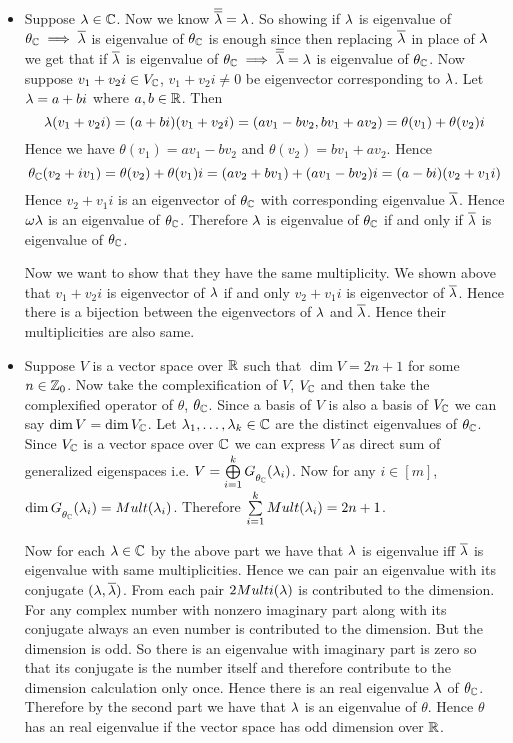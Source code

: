 \documentclass[a4paper, 11pt]{article}
\begin{document}
{\begin{itemize}[label=$\bullet$]
\begin{itemize}
			\item Suppose $\lambda \in \mathbb{C}$. Now we know $\overline{\overline{\lambda}}=\lambda$. So showing if $\lambda$ is eigenvalue of $\theta_{\mathbb{C}}\implies \overline{\lambda}$ is eigenvalue of $\theta_{\mathbb{C}}$ is enough since then replacing $\overline{\lambda}$ in place of $\lambda$ we get that if $\overline{\lambda}$ is eigenvalue of $\theta_{\mathbb{C}}\implies \overline{\overline{\lambda}}=\lambda$ is eigenvalue of $\theta_{\mathbb{C}}$. Now suppose $v_1+v_2i\in V_{\mathbb{C}}$, $v_1+v_2i\neq  0$ be eigenvector corresponding to $\lambda$. Let $\lambda=a+bi$ where $a,b\in \mathbb{R}$. Then $$\lambda(v_1+v_2i)=(a+bi)(v_1+v_2i)=(av_1-bv_2,bv_1+av_2)=\theta(v_1)+\theta(v_2)i$$Hence we have $\theta(v_1)=av_1-bv_2$ and $\theta(v_2)=bv_1+av_2$. Hence $$\theta_{\mathbb{C}}(v_2+iv_1)=\theta(v_2)+\theta(v_1)i=(av_2+bv_1)+(av_1-bv_2)i=(a-bi)(v_2+v_1i)$$Hence $v_2+v_1i$ is an eigenvector of $\theta_{\mathbb{C}}$ with corresponding eigenvalue $\overline{\lambda}$. Hence $\omega{\lambda}$ is an eigenvalue of $\theta_{\mathbb{C}}$. Therefore $\lambda$ is eigenvalue of $\theta_{\mathbb{C}}$ if and only if $\overline{\lambda}$ is eigenvalue of $\theta_{\mathbb{C}}$. \parinn
			
			Now we want to show that they have the same multiplicity. We shown above that $v_1+v_2i$ is eigenvector of $\lambda$ if and only $v_2+v_1i$ is eigenvector of $\overline{\lambda}$. Hence there is a bijection between the eigenvectors of $\lambda$ and $\overline{\lambda}$. Hence their multiplicities are also same.
			
			\item Suppose $V$ is a vector space over $\mathbb{R}$ such that $\dim V=2n+1$ for some $n\in  \mathbb{Z}_0$. Now take the complexification of $V$, $V_{\mathbb{C}}$ and then take the complexified operator of $\theta$, $\theta_{\mathbb{C}}$. Since a basis of $V$ is also a basis of $V_{\mathbb{C}}$ we can say $\dim V=\dim V_{\mathbb{C}}$.  Let $\lambda_1,\dots, \lambda_k\in\mathbb{C}$ are the distinct eigenvalues of $\theta_{\mathbb{C}}$. Since $V_{\mathbb{C}}$ is a vector space over $\mathbb{C}$ we can express $V$ as direct sum of generalized eigenspaces i.e. $V=\bigoplus\limits_{i=1}^k G\strut_{\theta_{\mathbb{C}}}(\lambda_i)$. Now for any $i\in[m]$, $\dim G\strut_{\theta_{\mathbb{C}}}(\lambda_i)=Mult(\lambda_i)$. Therefore $\sum\limits_{i=1}^k Mult(\lambda_i)=2n+1$. \parinn
			
			Now for each $\lambda\in \mathbb{C}$ by the above part we have that $\lambda$ is eigenvalue iff $\overline{\lambda}$ is eigenvalue with same multiplicities. Hence we can pair an eigenvalue with its conjugate $(\lambda,\overline{\lambda})$. From each pair $2Multi(\lambda)$ is contributed to the dimension. For any complex number with nonzero imaginary part along with its conjugate always an even number is contributed to the dimension. But the dimension is odd. So there is an eigenvalue with imaginary part is zero so that its conjugate is the number itself and therefore contribute to the dimension calculation only once. Hence there is an real eigenvalue $\lambda$ of $\theta_{\mathbb{C}}$. Therefore by the second part we have that $\lambda$ is an eigenvalue of $\theta$. Hence $\theta$ has an real eigenvalue if the vector space has odd dimension over $\mathbb{R}$. 
		\end{itemize}
\end{itemize}
}
\end{document}

